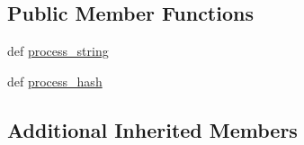 \subsection*{Public Member Functions}
\begin{DoxyCompactItemize}
\item 
def \hyperlink{classcheshire3_1_1base_objects_1_1_tokenizer_a6694a36e5e2164c7dd944aac85637125}{process\-\_\-string}
\item 
def \hyperlink{classcheshire3_1_1base_objects_1_1_tokenizer_a28ea52eeabaf49e2ea1009d2a22848fb}{process\-\_\-hash}
\end{DoxyCompactItemize}
\subsection*{Additional Inherited Members}


